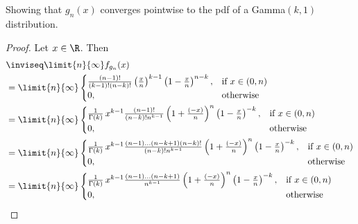 \documentclass[hwnumber=4,studentnumber=20053722]{mthe353answer}
\begin{document}
\begin{questions}
\begin{parts}
      \part{}
      Showing that \(g_n(x)\) converges pointwise to the pdf of a Gamma\((k,1)\)
      distribution.
      \begin{solutionfullwidth}
        \begin{solution}
          \begin{proof}
            Let \(x \in \R\). Then
            \begin{align*}
              &\inviseq \limit{n}{\infty} f_{g_n}(x)\\
              &= \limit{n}{\infty}
                \begin{cases}
                  \frac{(n-1)!}{(k-1)!(n-k)!} \left(\frac{x}{n}\right)^{k-1}
                    \left(1-\frac{x}{n}\right)^{n-k}, & \text{if } x \in (0,n) \\
                  0, & \text{otherwise}
                \end{cases}\\
              &= \limit{n}{\infty}
                \begin{cases}
                  \frac{1}{\Gamma(k)}\,x^{k-1}
                    \frac{(n-1)!}{(n-k)!n^{k-1}} \left(1+\frac{(-x)}{n}\right)^n
                    \left(1-\frac{x}{n}\right)^{-k}, & \text{if } x \in (0,n) \\
                  0, & \text{otherwise}
                \end{cases}\\
              &= \limit{n}{\infty}
                \begin{cases}
                  \frac{1}{\Gamma(k)}\,x^{k-1}
                    \frac{(n-1) \dots (n-k+1)(n-k)!}{(n-k)!n^{k-1}} \left(1+\frac{(-x)}{n}\right)^n
                    \left(1-\frac{x}{n}\right)^{-k}, & \text{if } x \in (0,n) \\
                  0, & \text{otherwise}
                \end{cases}\\
              &= \limit{n}{\infty}
                \begin{cases}
                  \frac{1}{\Gamma(k)}\,x^{k-1}
                    \frac{(n-1) \dots (n-k+1)}{n^{k-1}} \left(1+\frac{(-x)}{n}\right)^n
                    \left(1-\frac{x}{n}\right)^{-k}, & \text{if } x \in (0,n) \\
                  0, & \text{otherwise}
                \end{cases}\\

\end{align*}
\end{proof}
\end{solution}
\end{solutionfullwidth}
\end{parts}
\end{questions}
\end{document}
